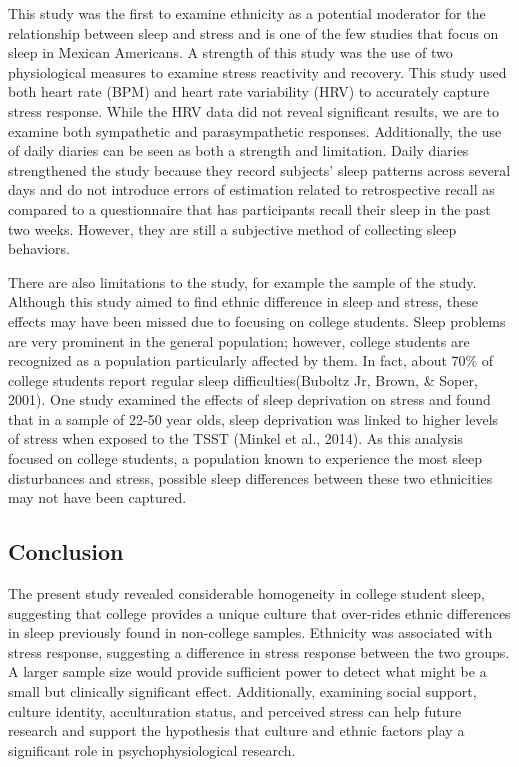 \documentclass[
  man, fleqn, noextraspace]{apa6}
\begin{document}
This study was the first to examine ethnicity as a potential moderator for the relationship between sleep and stress and is one of the few studies that focus on sleep in Mexican Americans. A strength of this study was the use of two physiological measures to examine stress reactivity and recovery. This study used both heart rate (BPM) and heart rate variability (HRV) to accurately capture stress response. While the HRV data did not reveal significant results, we are to examine both sympathetic and parasympathetic responses. Additionally, the use of daily diaries can be seen as both a strength and limitation. Daily diaries strengthened the study because they record subjects' sleep patterns across several days and do not introduce errors of estimation related to retrospective recall as compared to a questionnaire that has participants recall their sleep in the past two weeks. However, they are still a subjective method of collecting sleep behaviors.

There are also limitations to the study, for example the sample of the study. Although this study aimed to find ethnic difference in sleep and stress, these effects may have been missed due to focusing on college students. Sleep problems are very prominent in the general population; however, college students are recognized as a population particularly affected by them. In fact, about 70\% of college students report regular sleep difficulties(Buboltz Jr, Brown, \& Soper, 2001). One study examined the effects of sleep deprivation on stress and found that in a sample of 22-50 year olds, sleep deprivation was linked to higher levels of stress when exposed to the TSST (Minkel et al., 2014). As this analysis focused on college students, a population known to experience the most sleep disturbances and stress, possible sleep differences between these two ethnicities may not have been captured.

\hypertarget{conclusion}{%
\subsection{Conclusion}\label{conclusion}}

The present study revealed considerable homogeneity in college student sleep, suggesting that college provides a unique culture that over-rides ethnic differences in sleep previously found in non-college samples. Ethnicity was associated with stress response, suggesting a difference in stress response between the two groups. A larger sample size would provide sufficient power to detect what might be a small but clinically significant effect. Additionally, examining social support, culture identity, acculturation status, and perceived stress can help future research and support the hypothesis that culture and ethnic factors play a significant role in psychophysiological research.
\end{document}
